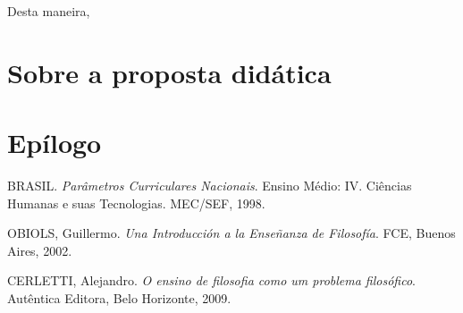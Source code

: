 \documentclass[12pt,a4paper]{article}
\begin{document}
	Desta maneira, 
	
	\newpage
	
	\section{Sobre a proposta didática}
	
	\newpage
	
	\section{Epílogo}
	
	\newpage
	
    \begin{thebibliography}{9}
		
		BRASIL. 
		\textit{Parâmetros Curriculares Nacionais}.  
		Ensino Médio: IV. Ciências Humanas e suas Tecnologias. 
		MEC/SEF, 1998. 
		
		OBIOLS, Guillermo. 
		\textit{Una Introducción a la Enseñanza de Filosofía}. 
		FCE, Buenos Aires, 2002. 
		
		CERLETTI, Alejandro. 
		\textit{O ensino de filosofia como um problema filosófico}. 
		Autêntica Editora, Belo Horizonte, 2009. 

	\end{thebibliography}
	
\end{document}
